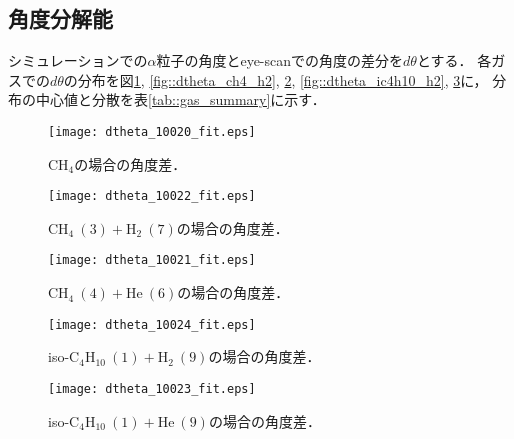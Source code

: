 \documentclass[../master]{subfiles}
\begin{document}
\subsection{角度分解能}
シミュレーションでの$\alpha$粒子の角度とeye-scanでの角度の差分を$d\theta$とする．
各ガスでの$d\theta$の分布を図\ref{fig::dtheta_ch4}, \ref{fig::dtheta_ch4_h2}, \ref{fig::dtheta_ch4_he},
\ref{fig::dtheta_ic4h10_h2}, \ref{fig::dtheta_ic4h10_he}に，
分布の中心値と分散を表\ref{tab::gas_summary}に示す．
\begin{figure}
  \centering
  \begin{minipage}{0.45\columnwidth}
    \centering
    \texttt{[image: dtheta\_10020\_fit.eps]}
    \caption{$\mathrm{CH}_{4}$の場合の角度差．}
    \label{fig::dtheta_ch4}
  \end{minipage}  
\end{figure}
\begin{figure}
  \centering
  \begin{minipage}{0.45\columnwidth}
    \centering
    \texttt{[image: dtheta\_10022\_fit.eps]}
    \caption{$\mathrm{CH}_{4}\ (3) + \mathrm{H}_{2}\ (7)$の場合の角度差．}
    \label{fig::dtheta_ch4_h2}
  \end{minipage}
  \begin{minipage}{0.45\columnwidth}
    \centering
    \texttt{[image: dtheta\_10021\_fit.eps]}
    \caption{$\mathrm{CH}_{4}\ (4) + \mathrm{He}\ (6)$の場合の角度差．}
    \label{fig::dtheta_ch4_he}
  \end{minipage}
\end{figure}
\begin{figure}
  \centering
  \begin{minipage}{0.45\columnwidth}
    \centering
    \texttt{[image: dtheta\_10024\_fit.eps]}
    \caption{iso-$\mathrm{C}_{4}\mathrm{H}_{10}\ (1) + \mathrm{H}_{2}\ (9)$の場合の角度差．}
    \label{fig::dtheta_ic4h10_h2}
  \end{minipage}
  \begin{minipage}{0.45\columnwidth}
    \centering
    \texttt{[image: dtheta\_10023\_fit.eps]}
    \caption{iso-$\mathrm{C}_{4}\mathrm{H}_{10}\ (1) + \mathrm{He}\ (9)$の場合の角度差．}
    \label{fig::dtheta_ic4h10_he}
  \end{minipage}
\end{figure}
\end{document}
